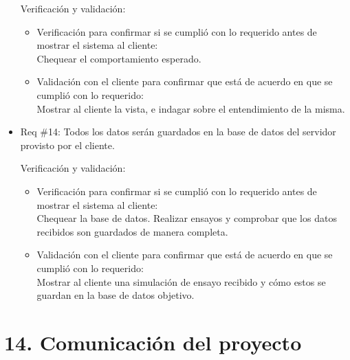 \documentclass[11pt]{charter}
\begin{document}
\begin{itemize}
Verificación y validación:

\begin{itemize}
\item Verificación para confirmar si se cumplió con lo requerido antes de mostrar el sistema al cliente:\\
Chequear el comportamiento esperado.
\item Validación con el cliente para confirmar que está de acuerdo en que se cumplió con lo requerido:\\
Mostrar al cliente la vista, e indagar sobre el entendimiento de la misma.
\end{itemize}

\item Req \#14: Todos los datos serán guardados en la base de datos del servidor provisto por el cliente.

Verificación y validación:

\begin{itemize}
\item Verificación para confirmar si se cumplió con lo requerido antes de mostrar el sistema al cliente:\\
Chequear la base de datos. Realizar ensayos y comprobar que los datos recibidos son guardados de manera completa.
\item Validación con el cliente para confirmar que está de acuerdo en que se cumplió con lo requerido:\\
Mostrar al cliente una simulación de ensayo recibido y cómo estos se guardan en la base de datos objetivo.
\end{itemize}


\end{itemize}



\section{14. Comunicación del proyecto}
\label{sec:comunicaciones}

\end{document}
